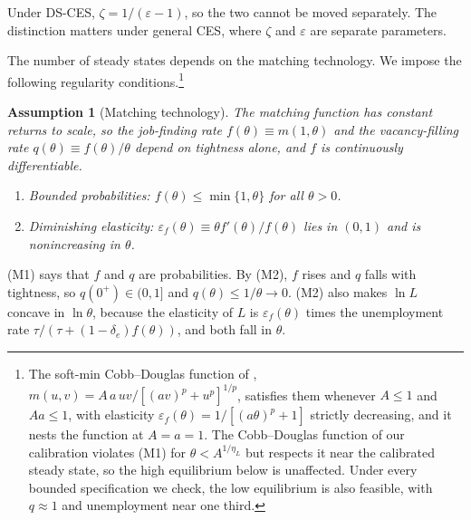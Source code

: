 \documentclass[authoryear, review, 12pt]{elsarticle}
\newtheorem{assumption}{Assumption}
\begin{document}
Under DS-CES, $\zeta=1/(\varepsilon-1)$, so the two cannot be moved separately. The
distinction matters under general CES, where $\zeta$ and $\varepsilon$ are separate
parameters.

The number of steady states depends on the matching technology. We impose the
following regularity conditions.\footnote{The soft-min Cobb--Douglas function of
\citet{silva_2026}, $m(u,v)=A\,a\,uv/[(av)^p+u^p]^{1/p}$, satisfies them whenever $A\leq1$
and $Aa\leq1$, with elasticity $\varepsilon_f(\theta)=1/[(a\theta)^p+1]$ strictly
decreasing, and it nests the \citet{den_haan_2000} function at $A=a=1$. The Cobb--Douglas
function of our calibration violates (M1) for $\theta<A^{1/\eta_L}$ but respects it near the
calibrated steady state, so the high equilibrium below is unaffected. Under every bounded
specification we check, the low equilibrium is also feasible, with $q\approx1$ and
unemployment near one third.}

\begin{assumption}[Matching technology]\label{ass:matching}
	The matching function has constant returns to scale, so the job-finding rate
	$f(\theta)\equiv m(1,\theta)$ and the vacancy-filling rate $q(\theta)\equiv f(\theta)/\theta$
	depend on tightness alone, and $f$ is continuously differentiable.
	\begin{enumerate}
		\item[(M1)] \emph{Bounded probabilities:} $f(\theta)\leq\min\{1,\theta\}$ for all $\theta>0$.
		\item[(M2)] \emph{Diminishing elasticity:} $\varepsilon_f(\theta)\equiv\theta f'(\theta)/f(\theta)$
		lies in $(0,1)$ and is nonincreasing in $\theta$.
	\end{enumerate}
\end{assumption}

(M1) says that $f$ and $q$ are probabilities. By (M2), $f$ rises and $q$ falls with tightness,
so $q(0^+)\in(0,1]$ and $q(\theta)\leq1/\theta\to0$. (M2) also makes $\ln L$ concave in
$\ln\theta$, because the elasticity of $L$ is $\varepsilon_f(\theta)$ times the unemployment
rate $\tau/(\tau+(1-\delta_e)f(\theta))$, and both fall in $\theta$.
\end{document}
